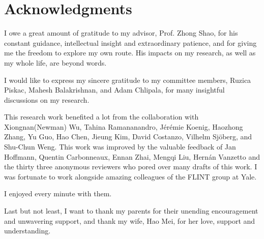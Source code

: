 

\chapter*{Acknowledgments}
\thispagestyle{empty}

I owe a great amount of gratitude to my advisor, Prof. Zhong Shao, for
his constant guidance, intellectual insight and extraordinary patience,
and for giving me the freedom to explore my own route.
His impacts on my research, as well as my whole life, are beyond words.

I would like to express my sincere gratitude to my committee members,
Ruzica Piskac, Mahesh Balakrishnan, and Adam Chlipala, for many insightful
discussions on my research.

This research work benefited a lot from 
the collaboration with Xiongnan(Newman) Wu,
Tahina Ramananandro,
J\'{e}r\'{e}mie Koenig,
Haozhong Zhang,
Yu Guo,
Hao Chen,
Jieung Kim,
David Costanzo,
Vilhelm Sj\"{o}berg,
and Shu-Chun Weng.
This work was improved by the valuable feedback of 
Jan Hoffmann,
Quentin Carbonneaux,
Ennan Zhai, Mengqi Liu,
Hern\'{a}n Vanzetto
and the thirty three anonymous reviewers who pored over many drafts
of this work.
I was fortunate to work alongside 
amazing colleagues of the FLINT group at Yale. 
I enjoyed every minute with them.

Last but not least, I want to thank my parents 
for their unending encouragement and unwavering support, 
and thank my wife, Hao Mei,
for her love, support and understanding.

\clearpage

